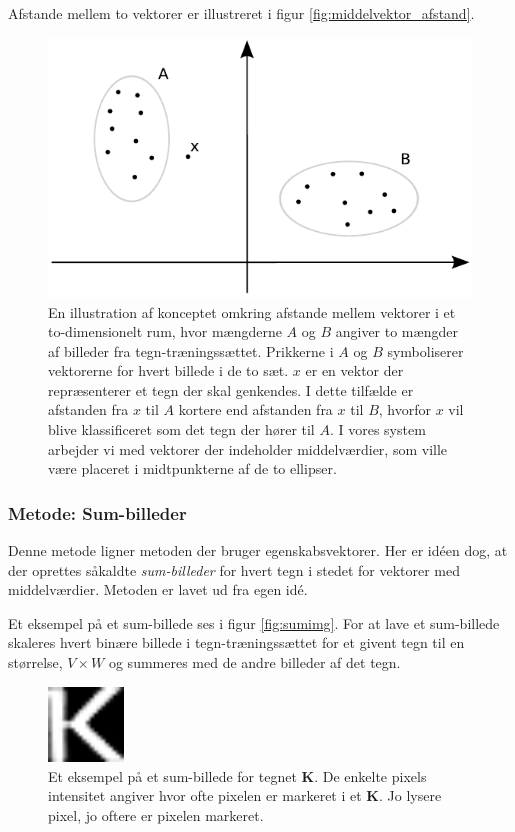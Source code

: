 Afstande mellem to vektorer er illustreret i figur \vref{fig:middelvektor_afstand}.

\begin{figure}[htp]
\centering
\includegraphics{system/illu/middelvektor_afstand.pdf} 
\caption{En illustration af konceptet omkring afstande mellem vektorer i et to-dimensionelt rum, hvor mængderne $A$ og $B$ angiver to mængder af billeder fra tegn-træningssættet. Prikkerne i $A$ og $B$ symboliserer vektorerne for hvert billede i de to sæt. $x$ er en vektor der repræsenterer et tegn der skal genkendes. I dette tilfælde er afstanden fra $x$ til $A$ kortere end afstanden fra $x$ til $B$, hvorfor $x$ vil blive klassificeret som det tegn der hører til $A$. I vores system arbejder vi med vektorer der indeholder middelværdier, som ville være placeret i midtpunkterne af de to ellipser.}
\label{fig:middelvektor_afstand}
\end{figure}

\subsubsection*{Metode: Sum-billeder}

Denne metode ligner metoden der bruger egenskabsvektorer. Her er idéen dog, at der oprettes såkaldte \textit{sum-billeder} for hvert tegn i stedet for vektorer med middelværdier. Metoden er lavet ud fra egen idé.

Et eksempel på et sum-billede ses i figur \vref{fig:sumimg}. For at lave et sum-billede skaleres hvert binære billede i tegn-træningssættet for et givent tegn til en størrelse, $V \times W$ og summeres med de andre billeder af det tegn.

\begin{figure}[htp]
\centering
\includegraphics[width=2cm]{system/illu/sumimg.png} 
\caption{Et eksempel på et sum-billede for tegnet \textbf{K}. De enkelte pixels intensitet angiver hvor ofte pixelen er markeret i et \textbf{K}. Jo lysere pixel, jo oftere er pixelen markeret.}
\label{fig:sumimg}
\end{figure}

